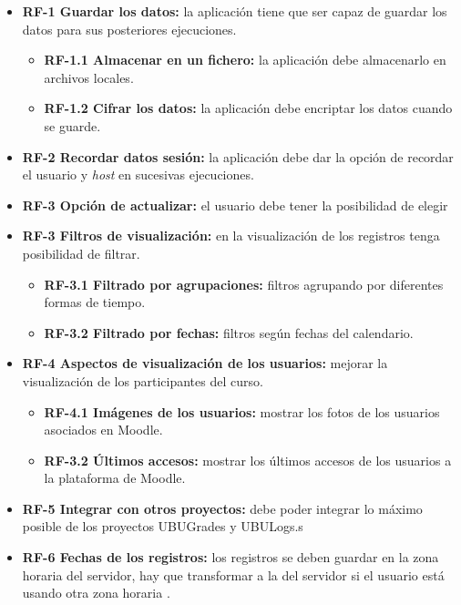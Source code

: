 \begin{itemize}
	

	\item \textbf{RF-1 Guardar los datos:} la aplicación tiene que ser capaz de guardar los datos para sus posteriores ejecuciones.
	\begin{itemize}
		\item \textbf{RF-1.1 Almacenar en un fichero:} la aplicación debe almacenarlo en archivos locales.
		\item \textbf{RF-1.2 Cifrar los datos:} la aplicación debe encriptar los datos cuando se guarde.
	\end{itemize}
	\item \textbf{RF-2 Recordar datos sesión:} la aplicación debe dar la opción de recordar el usuario y \textit{host} en sucesivas ejecuciones.
	\item \textbf{RF-3 Opción de actualizar:} el usuario debe tener la posibilidad de elegir 
	\item \textbf{RF-3 Filtros de visualización:} en la visualización de los registros tenga posibilidad de filtrar.
	\begin{itemize}
		\item \textbf{RF-3.1 Filtrado por agrupaciones:} filtros agrupando por diferentes formas de tiempo.
		\item \textbf{RF-3.2 Filtrado por fechas:} filtros según fechas del calendario.
	\end{itemize}
	\item \textbf{RF-4 Aspectos de visualización de los usuarios:} mejorar la visualización de los participantes del curso.
		\begin{itemize}
		\item \textbf{RF-4.1 Imágenes de los usuarios:} mostrar los fotos de los usuarios asociados en Moodle.
		\item \textbf{RF-3.2 Últimos accesos:} mostrar los últimos accesos de los usuarios a la plataforma de Moodle.
	\end{itemize}
	\item \textbf{RF-5 Integrar con otros proyectos:} debe poder integrar lo máximo posible de los proyectos UBUGrades y UBULogs.s
	\item \textbf{RF-6 Fechas de los registros:} los registros se deben guardar en la zona horaria del servidor, hay que transformar a la del servidor si el usuario está usando otra zona horaria .
	
	
\end{itemize}

